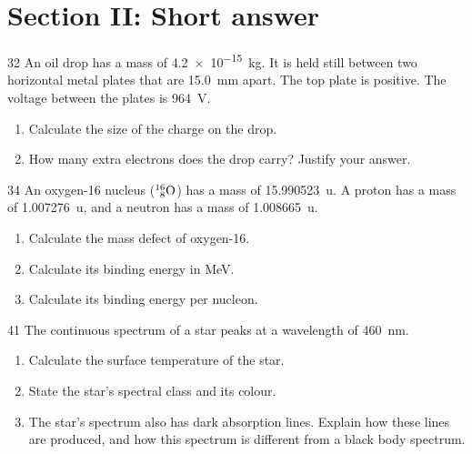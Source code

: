 \section*{Section II: Short answer}

\begin{practiceq}{3}{2}\label{pq:millikan}
An oil drop has a mass of \qty{4.2e-15}{kg}. It is held still between two horizontal metal
plates that are \qty{15.0}{mm} apart. The top plate is positive. The voltage between the
plates is \qty{964}{V}.
\begin{enumerate}[label=(\alph*)]
  \item Calculate the size of the charge on the drop. 
  \item How many extra electrons does the drop carry? Justify your answer.
\end{enumerate}
\end{practiceq}

\begin{practiceq}{3}{4}\label{pq:oxygen}
An oxygen-16 nucleus ($\pracNuc{16}{8}{O}$) has a mass of \qty{15.990523}{\amu}. A proton
has a mass of \qty{1.007276}{\amu}, and a neutron has a mass of \qty{1.008665}{\amu}.
\begin{enumerate}[label=(\alph*)]
  \item Calculate the mass defect of oxygen-16. 
  \item Calculate its binding energy in MeV. 
  \item Calculate its binding energy per nucleon. 
\end{enumerate}
\end{practiceq}

\begin{practiceq}{4}{1}\label{pq:wien}
The continuous spectrum of a star peaks at a wavelength of \qty{460}{nm}.
\begin{enumerate}[label=(\alph*)]
  \item Calculate the surface temperature of the star. 
  \item State the star's spectral class and its colour. 
  \item The star's spectrum also has dark absorption lines. Explain how these lines are
        produced, and how this spectrum is different from a black body spectrum.
\end{enumerate}
\end{practiceq}

